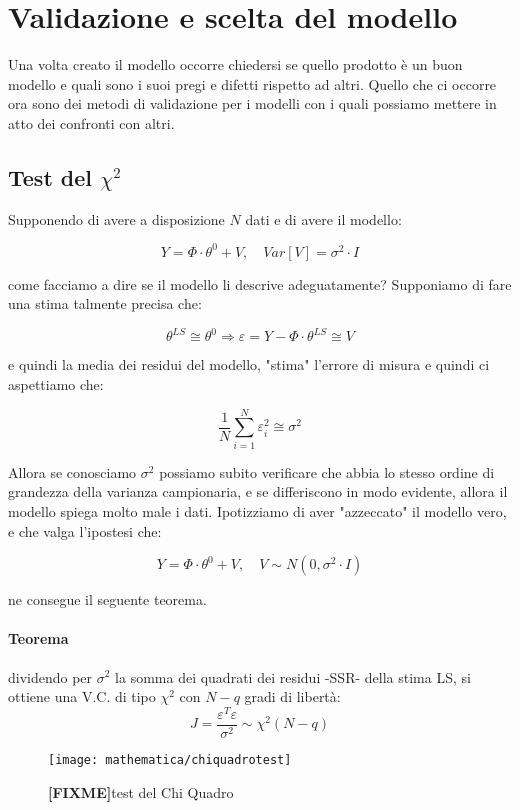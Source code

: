 \section{Validazione e scelta del modello}
Una volta creato il modello occorre chiedersi se quello prodotto è un buon modello e quali sono i suoi pregi e difetti rispetto ad altri. Quello che ci occorre ora sono dei metodi di validazione per i modelli con i quali possiamo mettere in atto dei confronti con altri. 
\subsection{Test del $\chi^2$}
Supponendo di avere a disposizione $N$ dati e di avere il modello:

    \[ Y=\Phi\cdot\theta^0+V, \quad Var[V]=\sigma^2\cdot I \]

come facciamo a dire se il modello li descrive adeguatamente? Supponiamo di fare una stima talmente precisa che:

    \[ \theta^{LS}\cong\theta^0 \Longrightarrow \varepsilon =Y-\Phi\cdot\theta^{LS}\cong V \]

e quindi la media dei residui del modello, "stima" l'errore di misura e quindi ci aspettiamo che:

    \[ \frac{1}{N}\sum_{i=1}^{N}{\varepsilon_i^2}\cong\sigma^2 \]

Allora se conosciamo $\sigma^2$ possiamo subito verificare che abbia lo stesso ordine di grandezza della varianza campionaria, e se differiscono in modo evidente, allora il modello spiega molto male i dati.
Ipotizziamo di aver "azzeccato" il modello vero, e che valga l'ipostesi che:

    \[ Y=\Phi\cdot\theta^0+V,  \quad  V\sim N(0,\sigma^2\cdot I) \]

ne consegue il seguente teorema.
\paragraph{Teorema} dividendo per $\sigma^2$ la somma dei quadrati dei residui -SSR- della stima LS, si ottiene una V.C. di tipo $\chi^2$ con $N-q$ gradi di libertà:
  \[ J=\frac{\varepsilon^T\varepsilon}{\sigma^2}\sim \chi^2(N-q) \]



\begin{figure}[htbp]
  \centering
  \texttt{[image: mathematica/chiquadrotest]}
  \caption{\textbf{[FIXME]}test del Chi Quadro\label{fig:chiquadrotest}}
\end{figure}

